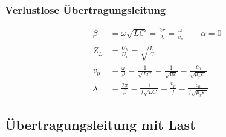 \subsubsection{Verlustlose Übertragungsleitung }
\begin{align*}
    \beta              & = \omega\sqrt{LC} = \frac{2 \pi}{\lambda} = \frac{\omega}{v_p}\qquad \alpha = 0 \\
    Z_L                & =\frac{U_h}{U_r}       = \sqrt{\frac{L}{C}}                                                                          \\
    v_p                & = \frac{\omega}{\beta} = \frac{1}{\sqrt{LC}}= \frac{1}{\sqrt{\mu\varepsilon}}= \frac{c_0}{\sqrt{\mu_r\varepsilon_r}} \\
    \lambda            & = \frac{2\pi}{\beta}=\frac{1}{f\sqrt{LC}}= \frac{v_p}{f}= \frac{c_0}{f\sqrt{\mu_r\varepsilon_r}}
\end{align*}


\subsection{Übertragungsleitung mit Last}




